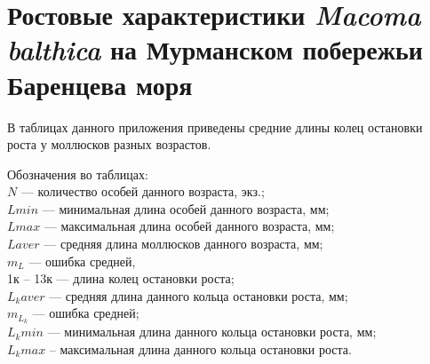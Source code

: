 
\section{Ростовые характеристики {\it Macoma balthica} на Мурманском побережьи Баренцева моря}
\label{app:growth_matrix}

В   таблицах данного приложения   приведены средние длины колец остановки роста у моллюсков разных возрастов.

\vspace{5em}

Обозначения во таблицах:\\[2em]
$N$ --- количество  особей  данного возраста, экз.;\\
$L min$  ---  минимальная   длина  особей   данного   возраста,   мм;\\
$L max$   ---   максимальная   длина   особей   данного   возраста,   мм;\\
$L aver$ --- средняя длина моллюсков данного возраста, мм;\\
$m_L$ --- ошибка средней,\\
1к -- 13к --- длина колец остановки роста;\\
$L_k aver$ --- средняя длина данного кольца остановки роста, мм;\\
$m_{L_k}$ --- ошибка средней;\\
$L_k min$ --- минимальная длина данного кольца остановки роста, мм; \\
$L_k   max$   --   максимальная   длина   данного   кольца   остановки   роста.   \\



